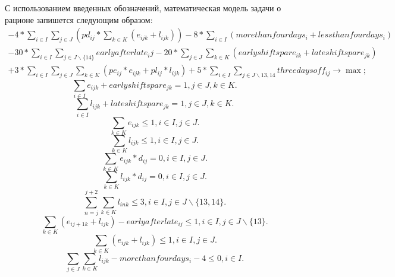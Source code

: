 \documentclass[]{article}
\begin{document}
С использованием введенных обозначений, математическая модель задачи о рационе
запишется следующим образом:
\begin{eqnarray}
-4 * \sum_{i\in I}\sum_{j\in J}(pd_{ij}*\sum_{k \in K}(e_{ijk}+l_{ijk}))
-8 * \sum_{i\in I}(morethanfourdays_i+lessthanfourdays_i) \\ \nonumber
-30 * \sum_{i\in I}\sum_{j \in J\backslash\{14\}} earlyafterlate_ij
-20 * \sum_{j \in J}\sum_{k \in K} (earlyshiftspare_{ik} + lateshiftspare_{jk}) \\ \nonumber
+ 3 * \sum_{i \in I}\sum_{j \in J}\sum_{k \in K} (pe_{ij}*e_{ijk} + pl_{ij}*l_{ijk})
+ 5 * \sum_{i \in I}\sum_{j \in J\backslash{13,14}} threedaysoff_{ij}\rightarrow\max;
\end{eqnarray}
\begin{equation}\label{spare1}
  \sum_{i \in I} e_{ijk} + earlyshiftspare_{jk} = 1, j \in J, k \in K.
\end{equation}
\begin{equation}\label{spare2}
  \sum_{i \in I} l_{ijk} + lateshiftspare_{jk} = 1, j \in J, k \in K.
\end{equation}
\begin{equation}\label{one1}
  \sum_{k \in K} e_{ijk} \leq 1, i \in I, j \in J.
\end{equation}
\begin{equation}\label{one2}
  \sum_{k \in K} l_{ijk} \leq 1, i \in I, j \in J.
\end{equation}
\begin{equation}\label{do1}
  \sum_{k \in K} e_{ijk}*d_{ij} = 0, i \in I, j \in J.
\end{equation}
\begin{equation}\label{do2}
  \sum_{k \in K} l_{ijk}*d_{ij} = 0, i \in I, j \in J.
\end{equation}
\begin{equation}\label{3days}
  \sum_{n = j}^{j+2}\sum_{k \in K} l_{ink} \leq 3, i \in I, j \in J\backslash\{13,14\}.
\end{equation}
\begin{equation}\label{earlyafterlate}
  \sum_{k \in K} (e_{i j+1 k} + l_{ijk})
              - earlyafterlate_{ij} \leq 1, i \in I, j \in J\backslash\{13\}.
\end{equation}
\begin{equation}\label{oneshift}
  \sum_{k \in K} (e_{ijk}+l_{ijk}) \leq 1, i \in I, j \in J.
\end{equation}
\begin{equation}\label{mtf}
  \sum_{j \in J}\sum_{k \in K} l_{ijk} - morethanfourdays_{i} - 4 \leq 0, i \in I.
\end{equation}
\end{document}
